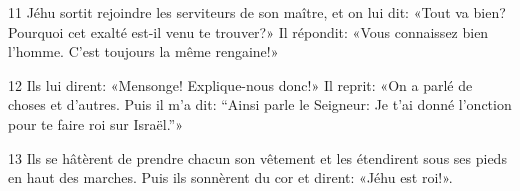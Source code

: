
11 Jéhu sortit rejoindre les serviteurs de son maître, et on lui dit: «Tout va bien? Pourquoi cet exalté est-il venu te trouver?» Il répondit: «Vous connaissez bien l’homme. C’est toujours la même rengaine!»

12 Ils lui dirent: «Mensonge! Explique-nous donc!» Il reprit: «On a parlé de choses et d’autres. Puis il m’a dit: “Ainsi parle le Seigneur: Je t’ai donné l’onction pour te faire roi sur Israël.”»

13 Ils se hâtèrent de prendre chacun son vêtement et les étendirent sous ses pieds en haut des marches. Puis ils sonnèrent du cor et dirent: «Jéhu est roi!».
